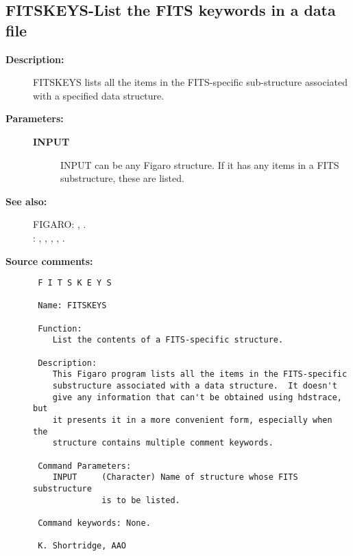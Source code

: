 \subsection{FITSKEYS-\label{FITSKEYS}List the FITS keywords in a data file}
\begin{description}

\item [{\bf Description:}]
 FITSKEYS lists all the items in the FITS-specific sub-structure
 associated with a specified data structure.

\item [{\bf Parameters:}]
\begin{description}
\item [{\bf INPUT}]
 INPUT can be any Figaro structure.  If it has any
 items in a FITS substructure, these are listed.
\end{description}

\item [{\bf See also:}]
FIGARO: , .\\
: , , , , .\\

\item [{\bf Source comments:}]
\begin{verbatim}
 F I T S K E Y S

 Name: FITSKEYS

 Function:
    List the contents of a FITS-specific structure.

 Description:
    This Figaro program lists all the items in the FITS-specific
    substructure associated with a data structure.  It doesn't
    give any information that can't be obtained using hdstrace, but
    it presents it in a more convenient form, especially when the
    structure contains multiple comment keywords.

 Command Parameters:
    INPUT     (Character) Name of structure whose FITS substructure
              is to be listed.

 Command keywords: None.

 K. Shortridge, AAO
\end{verbatim}
\end{description}
